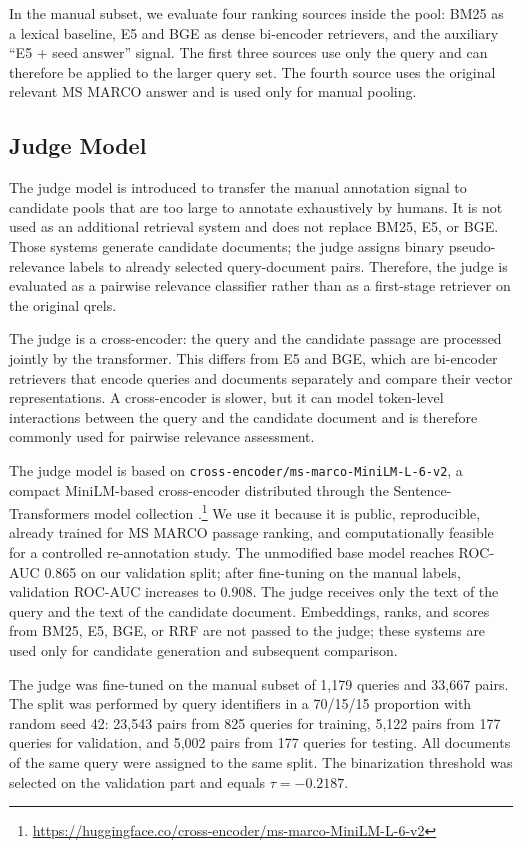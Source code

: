 \documentclass[runningheads,a4paper]{llncs}
\begin{document}
In the manual subset, we evaluate four ranking sources inside the pool: BM25 as a lexical baseline, E5 and BGE as dense bi-encoder retrievers, and the auxiliary ``E5 + seed answer'' signal. The first three sources use only the query and can therefore be applied to the larger query set. The fourth source uses the original relevant MS MARCO answer and is used only for manual pooling.

\subsection{Judge Model}

The judge model is introduced to transfer the manual annotation signal to candidate pools that are too large to annotate exhaustively by humans. It is not used as an additional retrieval system and does not replace BM25, E5, or BGE. Those systems generate candidate documents; the judge assigns binary pseudo-relevance labels to already selected query-document pairs. Therefore, the judge is evaluated as a pairwise relevance classifier rather than as a first-stage retriever on the original qrels.

The judge is a cross-encoder: the query and the candidate passage are processed jointly by the transformer. This differs from E5 and BGE, which are bi-encoder retrievers that encode queries and documents separately and compare their vector representations. A cross-encoder is slower, but it can model token-level interactions between the query and the candidate document and is therefore commonly used for pairwise relevance assessment.

The judge model is based on \texttt{cross-encoder/ms-marco-MiniLM-L-6-v2}, a compact MiniLM-based cross-encoder distributed through the Sentence-Transformers model collection \cite{wang2020minilm,reimers2019sentencebert}.\footnote{\url{https://huggingface.co/cross-encoder/ms-marco-MiniLM-L-6-v2}} We use it because it is public, reproducible, already trained for MS MARCO passage ranking, and computationally feasible for a controlled re-annotation study. The unmodified base model reaches ROC-AUC 0.865 on our validation split; after fine-tuning on the manual labels, validation ROC-AUC increases to 0.908. The judge receives only the text of the query and the text of the candidate document. Embeddings, ranks, and scores from BM25, E5, BGE, or RRF are not passed to the judge; these systems are used only for candidate generation and subsequent comparison.

The judge was fine-tuned on the manual subset of 1,179 queries and 33,667 pairs. The split was performed by query identifiers in a 70/15/15 proportion with random seed 42: 23,543 pairs from 825 queries for training, 5,122 pairs from 177 queries for validation, and 5,002 pairs from 177 queries for testing. All documents of the same query were assigned to the same split. The binarization threshold was selected on the validation part and equals $\tau=-0.2187$.
\end{document}
